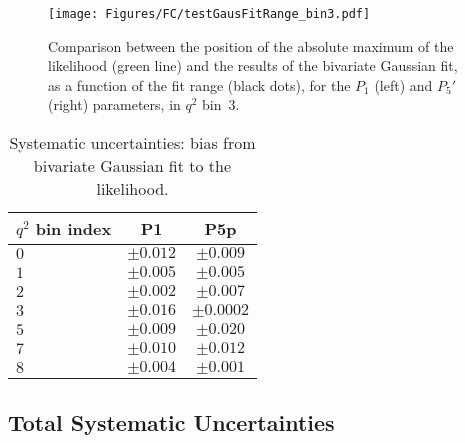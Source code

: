 \begin{figure}
  \centering
  \texttt{[image: Figures/FC/testGausFitRange\_bin3.pdf]}
  \caption{Comparison between the position of the absolute maximum of the likelihood (green line) and the results of the bivariate Gaussian fit, as a function of the fit range (black dots), for the $P_1$ (left) and $P_5'$ (right) parameters, in $q^2$ bin~3.
  }
  \label{fig:gausFitRange}
\end{figure}

\begin{table*}[!htb]
  \begin {center}
    \begin{small}
      \caption{Systematic uncertainties: bias from bivariate Gaussian fit to the likelihood.
        \label{tab:rangeGausFit}}
      \begin{tabular}{l|cc}
        \hline
        $q^2$ bin index   & P1 & P5p \\
        \hline
        $ 0 $    &   $\pm0.012$ & $\pm0.009 $   \\
        $ 1 $    &   $\pm0.005$ & $\pm0.005 $   \\
        $ 2 $    &   $\pm0.002$ & $\pm0.007 $   \\
        $ 3 $    &   $\pm0.016$ & $\pm0.0002$   \\
        $ 5 $    &   $\pm0.009$ & $\pm0.020 $   \\
        $ 7 $    &   $\pm0.010$ & $\pm0.012 $   \\
        $ 8 $    &   $\pm0.004$ & $\pm0.001 $   \\
        \hline
      \end{tabular}
    \end{small}
  \end{center}
\end{table*}

\clearpage
\subsection{Total Systematic Uncertainties}
\label{sec:sys-total}

